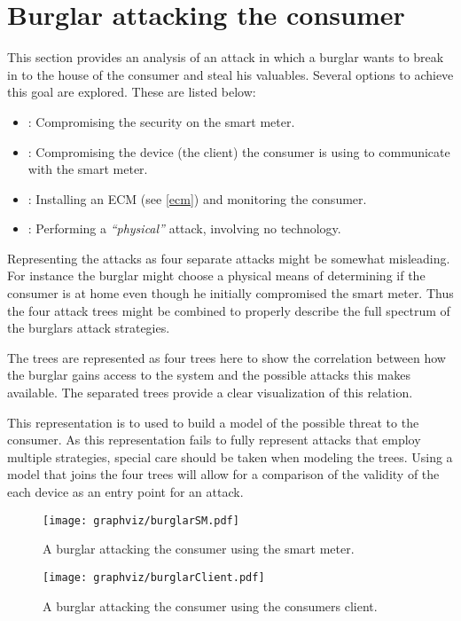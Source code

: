 \section{Burglar attacking the consumer}
This section provides an analysis of an attack in which a burglar wants to break in to the house of the consumer and steal his valuables.
Several options to achieve this goal are explored.
These are listed below:
\begin{itemize}
  \item {}: Compromising the security on the smart meter.
  \item {}: Compromising the device (the client) the consumer is using to communicate with the smart meter.
  \item {}: Installing an ECM (see \cref{ecm}) and monitoring the consumer.
  \item {}: Performing a \emph{``physical''} attack, involving no technology.
\end{itemize}

Representing the attacks as four separate attacks might be somewhat misleading.
For instance the burglar might choose a physical means of determining if the consumer is at home even though he initially compromised the smart meter.
Thus the four attack trees might be combined to properly describe the full spectrum of the burglars attack strategies.

The trees are represented as four trees here to show the correlation between how the burglar gains access to the system and the possible attacks this makes available.
The separated trees provide a clear visualization of this relation.

This representation is to used to build a model of the possible threat to the consumer.
As this representation fails to fully represent attacks that employ multiple strategies, special care should be taken when modeling the trees.
Using a model that joins the four trees will allow for a comparison of the validity of the each device as an entry point for an attack.

\begin{figure}
\center
\texttt{[image: graphviz/burglarSM.pdf]}
\caption{A burglar attacking the consumer using the smart meter.}
\label{attacktree:burglar:sm}
\end{figure}

\begin{figure}
\center
\texttt{[image: graphviz/burglarClient.pdf]}
\caption{A burglar attacking the consumer using the consumers client.}
\label{attacktree:burglar:client}
\end{figure}

